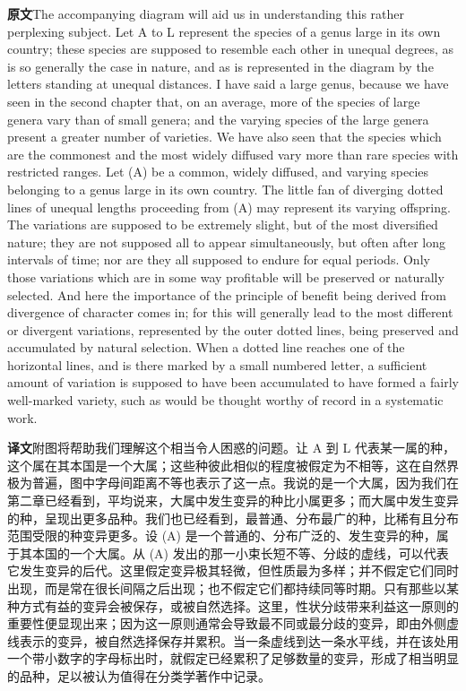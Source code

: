 \documentclass[UTF8,zihao=-4]{ctexart}
\newcommand{\BodyFont}{\fontsize{10.5pt}{15.5pt}\selectfont}
\newcommand{\origlabel}{\textbf{原文}\quad}
\newcommand{\translabel}{\textbf{译文}\quad}
\newenvironment{enblock}{\par\noindent\begingroup\BodyFont\origlabel}{\par\endgroup}
\newenvironment{zhblock}{\par\noindent\begingroup\BodyFont\translabel}{\par\endgroup\vspace{0.35em}}
\newcommand{\pair}[2]{\begin{enblock}#1\end{enblock}\begin{zhblock}#2\end{zhblock}}
\begin{document}
\pair{The accompanying diagram will aid us in understanding this rather perplexing subject. Let A to L represent the species of a genus large in its own country; these species are supposed to resemble each other in unequal degrees, as is so generally the case in nature, and as is represented in the diagram by the letters standing at unequal distances. I have said a large genus, because we have seen in the second chapter that, on an average, more of the species of large genera vary than of small genera; and the varying species of the large genera present a greater number of varieties. We have also seen that the species which are the commonest and the most widely diffused vary more than rare species with restricted ranges. Let (A) be a common, widely diffused, and varying species belonging to a genus large in its own country. The little fan of diverging dotted lines of unequal lengths proceeding from (A) may represent its varying offspring. The variations are supposed to be extremely slight, but of the most diversified nature; they are not supposed all to appear simultaneously, but often after long intervals of time; nor are they all supposed to endure for equal periods. Only those variations which are in some way profitable will be preserved or naturally selected. And here the importance of the principle of benefit being derived from divergence of character comes in; for this will generally lead to the most different or divergent variations, represented by the outer dotted lines, being preserved and accumulated by natural selection. When a dotted line reaches one of the horizontal lines, and is there marked by a small numbered letter, a sufficient amount of variation is supposed to have been accumulated to have formed a fairly well-marked variety, such as would be thought worthy of record in a systematic work.}{附图将帮助我们理解这个相当令人困惑的问题。让 A 到 L 代表某一属的种，这个属在其本国是一个大属；这些种彼此相似的程度被假定为不相等，这在自然界极为普遍，图中字母间距离不等也表示了这一点。我说的是一个大属，因为我们在第二章已经看到，平均说来，大属中发生变异的种比小属更多；而大属中发生变异的种，呈现出更多品种。我们也已经看到，最普通、分布最广的种，比稀有且分布范围受限的种变异更多。设 (A) 是一个普通的、分布广泛的、发生变异的种，属于其本国的一个大属。从 (A) 发出的那一小束长短不等、分歧的虚线，可以代表它发生变异的后代。这里假定变异极其轻微，但性质最为多样；并不假定它们同时出现，而是常在很长间隔之后出现；也不假定它们都持续同等时期。只有那些以某种方式有益的变异会被保存，或被自然选择。这里，性状分歧带来利益这一原则的重要性便显现出来；因为这一原则通常会导致最不同或最分歧的变异，即由外侧虚线表示的变异，被自然选择保存并累积。当一条虚线到达一条水平线，并在该处用一个带小数字的字母标出时，就假定已经累积了足够数量的变异，形成了相当明显的品种，足以被认为值得在分类学著作中记录。}
\end{document}
